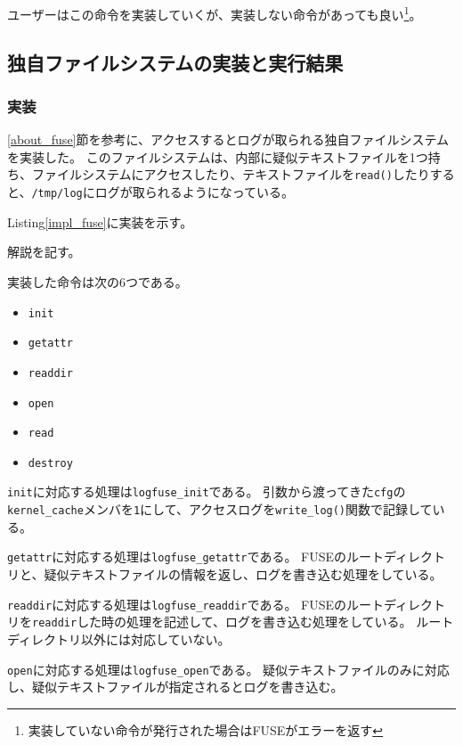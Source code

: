 \documentclass[main]{subfiles}
\begin{document}
ユーザーはこの命令を実装していくが、実装しない命令があっても良い\footnote{実装していない命令が発行された場合はFUSEがエラーを返す}。

\subsection{独自ファイルシステムの実装と実行結果}

\subsubsection{実装}

\ref{about_fuse}節を参考に、アクセスするとログが取られる独自ファイルシステムを実装した。
このファイルシステムは、内部に疑似テキストファイルを1つ持ち、ファイルシステムにアクセスしたり、テキストファイルを\texttt{read()}したりすると、\texttt{/tmp/log}にログが取られるようになっている。

Listing\ref{impl_fuse}に実装を示す。



解説を記す。

実装した命令は次の6つである。

\begin{itemize}
 \item \texttt{init}
 \item \texttt{getattr}
 \item \texttt{readdir}
 \item \texttt{open}
 \item \texttt{read}
 \item \texttt{destroy}
\end{itemize}

\texttt{init}に対応する処理は\texttt{logfuse\_init}である。
引数から渡ってきた\texttt{cfg}の\texttt{kernel\_cache}メンバを\texttt{1}にして、アクセスログを\texttt{write\_log()}関数で記録している。

\texttt{getattr}に対応する処理は\texttt{logfuse\_getattr}である。
FUSEのルートディレクトリと、疑似テキストファイルの情報を返し、ログを書き込む処理をしている。

\texttt{readdir}に対応する処理は\texttt{logfuse\_readdir}である。
FUSEのルートディレクトリを\texttt{readdir}した時の処理を記述して、ログを書き込む処理をしている。
ルートディレクトリ以外には対応していない。

\texttt{open}に対応する処理は\texttt{logfuse\_open}である。
疑似テキストファイルのみに対応し、疑似テキストファイルが指定されるとログを書き込む。
\end{document}

